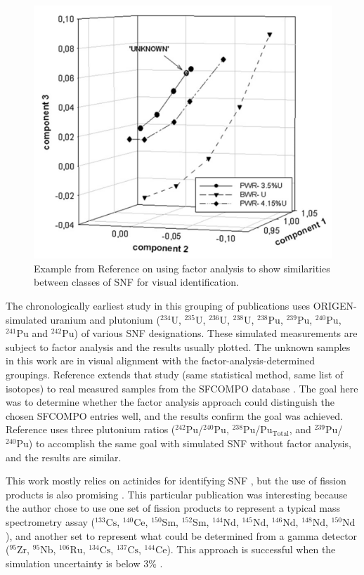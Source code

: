 \begin{figure}[!htb]
  \centering
  \includegraphics[width=0.5\linewidth]{./chapters/litrev/nicolaou.png}
  \caption[Example of factor analysis for \acrshort{SNF} discrimination]
          {Example from Reference \cite{nicolaou_pu} on using factor analysis
           to show similarities between classes of \acrshort{SNF} for visual 
           identification.}
  \label{fig:nico}
\end{figure}

The chronologically earliest study in this grouping of publications
\cite{nicolaou_2006} uses \gls{ORIGEN}-simulated uranium and plutonium
(${}^{234}\text{U}$, ${}^{235}\text{U}$, ${}^{236}\text{U}$,
${}^{238}\text{U}$, ${}^{238}\text{Pu}$, ${}^{239}\text{Pu}$,
${}^{240}\text{Pu}$, ${}^{241}\text{Pu}$ and ${}^{242}\text{Pu}$) of various
\gls{SNF} designations.  These simulated measurements are subject to factor
analysis and the results usually plotted.  The unknown samples in this work are
in visual alignment with the factor-analysis-determined groupings.  Reference
\cite{nicolaou_2014} extends that study (same statistical method, same list of
isotopes) to real measured samples from the \gls{SFCOMPO} database
\cite{sfcompo, valid_sfco}.  The goal here was to determine whether the factor
analysis approach could distinguish the chosen \gls{SFCOMPO} entries well, and
the results confirm the goal was achieved.  Reference \cite{nicolaou_2015} uses
three plutonium ratios (${}^{242}\text{Pu}$/${}^{240}\text{Pu}$,
${}^{238}\text{Pu}$/$\text{Pu}_{\text{Total}}$, and
${}^{239}\text{Pu}$/${}^{240}\text{Pu}$) to accomplish the same goal with
simulated \gls{SNF} without factor analysis, and the results are similar. 

This work mostly relies on actinides for identifying \gls{SNF}
\cite{nicolaou_2006, nicolaou_pu, nicolaou_2014, nicolaou_2015}, but the use of
fission products is also promising \cite{nicolaou_2009}.  This particular
publication was interesting because the author chose to use one set of fission
products to represent a typical mass spectrometry assay (${}^{133}\text{Cs}$,
${}^{140}\text{Ce}$, ${}^{150}\text{Sm}$, ${}^{152}\text{Sm}$,
${}^{144}\text{Nd}$, ${}^{145}\text{Nd}$, ${}^{146}\text{Nd}$,
${}^{148}\text{Nd}$, ${}^{150}\text{Nd}$), and another set to represent what
could be determined from a gamma detector (${}^{95}\text{Zr}$,
${}^{95}\text{Nb}$, ${}^{106}\text{Ru}$, ${}^{134}\text{Cs}$,
${}^{137}\text{Cs}$, ${}^{144}\text{Ce}$).  This approach is successful when
the simulation uncertainty is below 3\% \cite{nicolaou_2009}.

